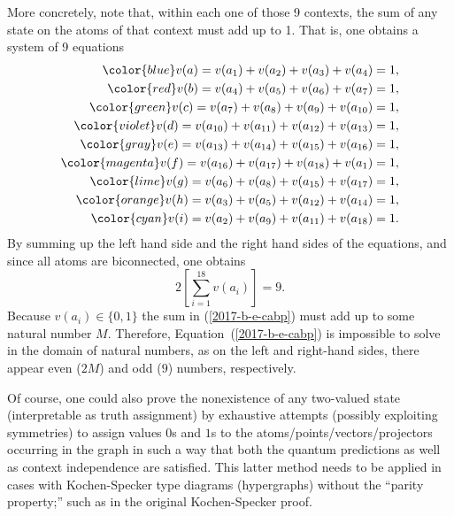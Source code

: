 {More concretely,  note that, within each one of those 9 contexts,
the sum of any state on the atoms of that context must add up to 1.
That is, %
one obtains a system of 9 equations
\begin{equation}
\begin{split}
\color{blue}        v(a)= v( a_1 ) + v( a_2 ) + v( a_3 ) + v( a_4 ) = 1 ,                  \\
\color{red}         v(b)= v( a_4 ) + v( a_5 ) + v( a_6 ) + v( a_7 ) = 1 ,                  \\
\color{green}       v(c)= v( a_7 ) + v( a_8 ) + v( a_9 ) + v( a_{10} ) = 1 ,               \\
\color{violet}      v(d)= v( a_{10} ) + v( a_{11} ) + v( a_{12} ) + v( a_{13} ) = 1 ,      \\
\color{gray}        v(e)= v( a_{13} ) + v( a_{14} ) + v( a_{15} ) + v( a_{16} ) = 1 ,      \\
\color{magenta}     v(f)= v( a_{16} ) + v( a_{17} ) + v( a_{18} ) + v( a_1 ) = 1 ,         \\
\color{lime}        v(g)= v( a_6 ) + v( a_8 ) + v( a_{15} ) + v( a_{17} ) = 1 ,            \\
\color{orange}      v(h)= v( a_3 ) + v( a_5 ) + v( a_{12} ) + v( a_{14} ) = 1 ,            \\
\color{cyan}        v(i)= v( a_2 ) + v( a_9 ) + v( a_{11} ) + v( a_{18} ) = 1 .
\label{2017-b-e-cabp-conf}
\end{split}
\end{equation}
By summing up the left hand side and the right hand sides of the equations, and since all atoms are biconnected,
one obtains
\begin{equation}
2 \left[\sum_{i=1}^{18} v(a_i)\right] = 9.
\label{2017-b-e-cabp}
\end{equation}
Because $v(a_i)\in \{0,1\}$ the sum in (\ref{2017-b-e-cabp}) must add up to some natural number $M$.
Therefore, Equation~(\ref{2017-b-e-cabp}) is impossible to solve in the domain of natural numbers,
as on the left and right-hand sides, there appear even ($2M$) and odd ($9$) numbers, respectively.

Of course, one could also prove the nonexistence of any  two-valued state (interpretable as truth assignment)
by exhaustive attempts
(possibly exploiting symmetries) to assign values $0$s and $1$s to the atoms/points/vectors/projectors occurring in the graph
in such a way that both the quantum predictions as well as context independence are satisfied.
This latter method needs to be applied in cases with Kochen-Specker type diagrams (hypergraphs) without the  ``parity property;''
such as in the original Kochen-Specker proof.\cite[-50mm]{kochen1}


\bproof
}

